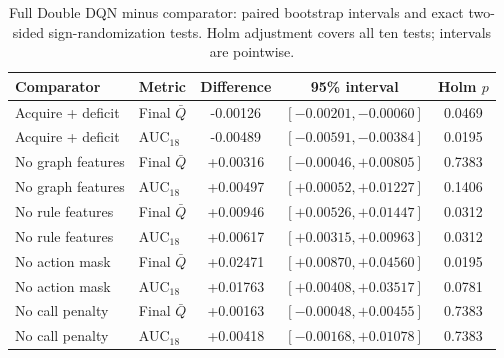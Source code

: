 \begin{table}[t]
\centering
\caption{Full Double DQN minus comparator: paired bootstrap intervals and exact two-sided sign-randomization tests. Holm adjustment covers all ten tests; intervals are pointwise.}
\label{tab:offline_tests}
\footnotesize
\setlength{\tabcolsep}{3pt}
\begin{tabular*}{\textwidth}{@{\extracolsep{\fill}}llccc@{}}
\toprule
Comparator & Metric & Difference & 95\% interval & Holm $p$ \\
\midrule
Acquire + deficit & Final $\bar Q$ & -0.00126 & $[-0.00201,-0.00060]$ & 0.0469 \\
Acquire + deficit & AUC$_{18}$ & -0.00489 & $[-0.00591,-0.00384]$ & 0.0195 \\
No graph features & Final $\bar Q$ & +0.00316 & $[-0.00046,+0.00805]$ & 0.7383 \\
No graph features & AUC$_{18}$ & +0.00497 & $[+0.00052,+0.01227]$ & 0.1406 \\
No rule features & Final $\bar Q$ & +0.00946 & $[+0.00526,+0.01447]$ & 0.0312 \\
No rule features & AUC$_{18}$ & +0.00617 & $[+0.00315,+0.00963]$ & 0.0312 \\
No action mask & Final $\bar Q$ & +0.02471 & $[+0.00870,+0.04560]$ & 0.0195 \\
No action mask & AUC$_{18}$ & +0.01763 & $[+0.00408,+0.03517]$ & 0.0781 \\
No call penalty & Final $\bar Q$ & +0.00163 & $[-0.00048,+0.00455]$ & 0.7383 \\
No call penalty & AUC$_{18}$ & +0.00418 & $[-0.00168,+0.01078]$ & 0.7383 \\
\bottomrule
\end{tabular*}
\end{table}
